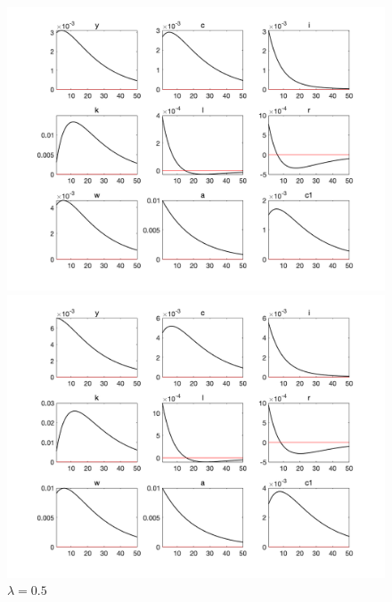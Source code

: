 \documentclass[a4paper,12pt]{ctexart}
\begin{document}
\begin{figure}[H]
    \begin{minipage}{0.48\linewidth}
        \includegraphics[width=\linewidth]{img/figure0.1.png}
        \caption{$\lambda=0.1$}
    \end{minipage}
    \begin{minipage}{0.48\linewidth}
        \includegraphics[width=\linewidth]{img/figure1.png}
        \caption{$\lambda=0.5$}
    \end{minipage}
    \begin{minipage}{0.48\linewidth}

\end{minipage}
\end{figure}
\end{document}
